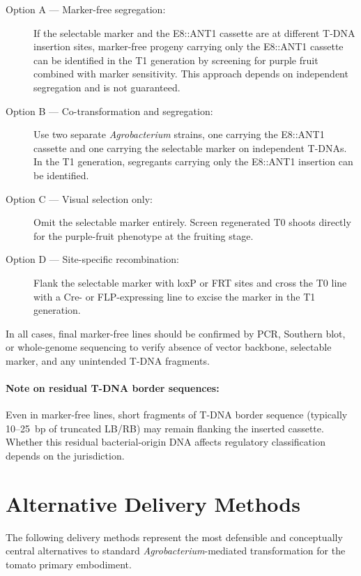 \documentclass[12pt,a4paper]{article}
\begin{document}
\begin{description}
  \item[Option A --- Marker-free segregation:] If the selectable marker and the E8::ANT1 cassette are at different T-DNA insertion sites, marker-free progeny carrying only the E8::ANT1 cassette can be identified in the T1 generation by screening for purple fruit combined with marker sensitivity. This approach depends on independent segregation and is not guaranteed.
  \item[Option B --- Co-transformation and segregation:] Use two separate \textit{Agrobacterium} strains, one carrying the E8::ANT1 cassette and one carrying the selectable marker on independent T-DNAs. In the T1 generation, segregants carrying only the E8::ANT1 insertion can be identified.
  \item[Option C --- Visual selection only:] Omit the selectable marker entirely. Screen regenerated T0 shoots directly for the purple-fruit phenotype at the fruiting stage.
  \item[Option D --- Site-specific recombination:] Flank the selectable marker with loxP or FRT sites and cross the T0 line with a Cre- or FLP-expressing line to excise the marker in the T1 generation.
\end{description}

In all cases, final marker-free lines should be confirmed by PCR, Southern blot, or whole-genome sequencing to verify absence of vector backbone, selectable marker, and any unintended T-DNA fragments.

\paragraph{Note on residual T-DNA border sequences:} Even in marker-free lines, short fragments of T-DNA border sequence (typically 10--25~bp of truncated LB/RB) may remain flanking the inserted cassette. Whether this residual bacterial-origin DNA affects regulatory classification depends on the jurisdiction.

\section{Alternative Delivery Methods}
\label{sec:delivery}

The following delivery methods represent the most defensible and conceptually central alternatives to standard \textit{Agrobacterium}-mediated transformation for the tomato primary embodiment.
\end{document}
